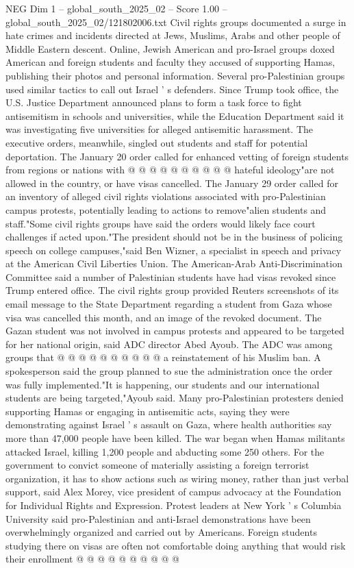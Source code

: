\begin{textsample}{NEG Dim 1 – global\_south\_2025\_02 – Score 1.00 – global\_south\_2025\_02/121802006.txt}
Civil rights groups documented a surge in hate crimes and incidents directed at Jews, Muslims, Arabs and other people of Middle Eastern descent.
Online, Jewish American and pro-Israel groups doxed American and foreign students and faculty they accused of supporting Hamas, publishing their photos and personal information.
Several pro-Palestinian groups used similar tactics to call out Israel ' s defenders.
Since Trump took office, the U.S.
Justice Department announced plans to form a task force to fight antisemitism in schools and universities, while the Education Department said it was investigating five universities for alleged antisemitic harassment.
The executive orders, meanwhile, singled out students and staff for potential deportation.
The January 20 order called for enhanced vetting of foreign students from regions or nations with @ @ @ @ @ @ @ @ @ @ hateful ideology"are not allowed in the country, or have visas cancelled.
The January 29 order called for an inventory of alleged civil rights violations associated with pro-Palestinian campus protests, potentially leading to actions to remove"alien students and staff."Some civil rights groups have said the orders would likely face court challenges if acted upon."The president should not be in the business of policing speech on college campuses,"said Ben Wizner, a specialist in speech and privacy at the American Civil Liberties Union.
The American-Arab Anti-Discrimination Committee said a number of Palestinian students have had visas revoked since Trump entered office.
The civil rights group provided Reuters screenshots of its email message to the State Department regarding a student from Gaza whose visa was cancelled this month, and an image of the revoked document.
The Gazan student was not involved in campus protests and appeared to be targeted for her national origin, said ADC director Abed Ayoub.
The ADC was among groups that @ @ @ @ @ @ @ @ @ @ a reinstatement of his Muslim ban.
A spokesperson said the group planned to sue the administration once the order was fully implemented."It is happening, our students and our international students are being targeted,"Ayoub said.
Many pro-Palestinian protesters denied supporting Hamas or engaging in antisemitic acts, saying they were demonstrating against Israel ' s assault on Gaza, where health authorities say more than 47,000 people have been killed.
The war began when Hamas militants attacked Israel, killing 1,200 people and abducting some 250 others.
For the government to convict someone of materially assisting a foreign terrorist organization, it has to show actions such as wiring money, rather than just verbal support, said Alex Morey, vice president of campus advocacy at the Foundation for Individual Rights and Expression.
Protest leaders at New York ' s Columbia University said pro-Palestinian and anti-Israel demonstrations have been overwhelmingly organized and carried out by Americans.
Foreign students studying there on visas are often not comfortable doing anything that would risk their enrollment @ @ @ @ @ @ @ @ @ @

\end{textsample}
